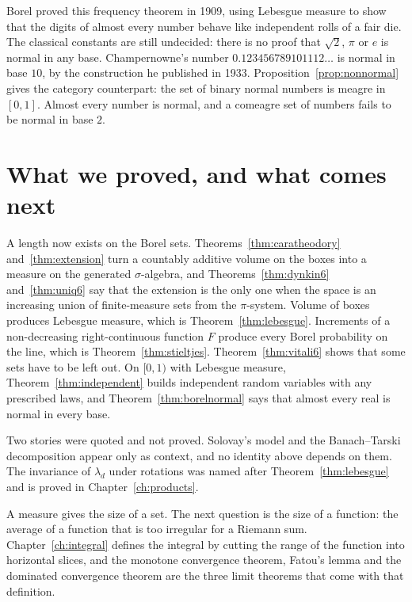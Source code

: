\begin{beauty}
Borel proved this frequency theorem in 1909, using Lebesgue measure to show that the digits of almost every number behave like independent rolls of a fair die.
The classical constants are still undecided: there is no proof that $\sqrt2$, $\pi$ or $e$ is normal in any base.
Champernowne's number $0.123456789101112\ldots$ is normal in base $10$, by the construction he published in 1933.
Proposition~\ref{prop:nonnormal} gives the category counterpart: the set of binary normal numbers is meagre in $[0,1]$.
Almost every number is normal, and a comeagre set of numbers fails to be normal in base $2$.
\end{beauty}

\section{What we proved, and what comes next}

A length now exists on the Borel sets.
Theorems~\ref{thm:caratheodory} and~\ref{thm:extension} turn a countably additive volume on the boxes into a measure on the generated $\sigma$-algebra, and Theorems~\ref{thm:dynkin6} and~\ref{thm:uniq6} say that the extension is the only one when the space is an increasing union of finite-measure sets from the $\pi$-system.
Volume of boxes produces Lebesgue measure, which is Theorem~\ref{thm:lebesgue}.
Increments of a non-decreasing right-continuous function $F$ produce every Borel probability on the line, which is Theorem~\ref{thm:stieltjes}.
Theorem~\ref{thm:vitali6} shows that some sets have to be left out.
On $[0,1)$ with Lebesgue measure, Theorem~\ref{thm:independent} builds independent random variables with any prescribed laws, and Theorem~\ref{thm:borelnormal} says that almost every real is normal in every base.

Two stories were quoted and not proved.
Solovay's model and the Banach--Tarski decomposition appear only as context, and no identity above depends on them.
The invariance of $\lambda_d$ under rotations was named after Theorem~\ref{thm:lebesgue} and is proved in Chapter~\ref{ch:products}.

A measure gives the size of a set.
The next question is the size of a function: the average of a function that is too irregular for a Riemann sum.
Chapter~\ref{ch:integral} defines the integral by cutting the range of the function into horizontal slices, and the monotone convergence theorem, Fatou's lemma and the dominated convergence theorem are the three limit theorems that come with that definition.

